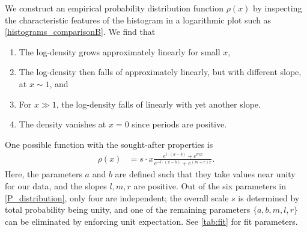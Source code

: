 \documentclass[11pt,a4paper]{article}
\renewcommand{\|}{\rule[-0.4ex]{0.2ex}{1.2em}}
\begin{document}
We construct an empirical probability distribution function $\rho(x)$ by inspecting the characteristic features of the histogram in a logarithmic plot such as \cref{histograms_comparisonB}. We find that 
\begin{enumerate}
	\item The log-density grows approximately linearly for small $x$,
	\item The log-density then falls of approximately linearly, but with different slope, at $x \sim 1$, and
	\item For $x \gg 1$, the log-density falls of linearly with yet another slope.
	\item The density vanishes at $x=0$ since periods are positive.
\end{enumerate}
One possible function with the sought-after properties is
\begin{align}\label{P_distribution}
\rho(x) &= s \cdot x \frac{e^{l\cdot (a-b)  } + e^{m x}}{e^{-l \cdot (x-b)} + e^{(m+r)x}}.
\end{align}
Here, the parameters $a$ and $b$ are defined such that they take values near unity for our data, and the slopes $l,m,r$ are positive.
Out of the six parameters in \cref{P_distribution}, only four are independent; the overall scale $s$ is determined by total  probability being unity,
and one of the remaining parameters $\{a,b,m,l,r\}$  can be eliminated by enforcing unit expectation.   See \cref{tab:fit} for fit parameters.
\end{document}
